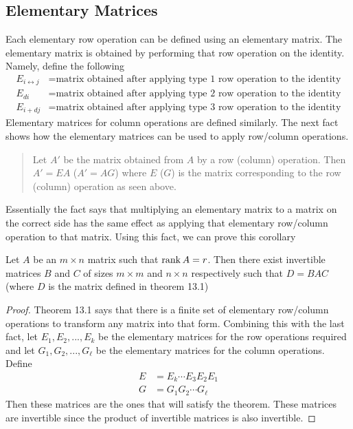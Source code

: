 \documentclass[main.tex]{subfiles}
\begin{document}
    \subsection{Elementary Matrices}
    Each elementary row operation can be defined using an elementary matrix. The elementary matrix is obtained by performing that row operation on the identity. Namely, define the following 
    \begin{align*}
        E_{i\longleftrightarrow j} &= \text{matrix obtained after applying type 1 row operation to the identity} \\ 
        E_{di} &= \text{matrix obtained after applying type 2 row operation to the identity} \\
        E_{i+dj} &= \text{matrix obtained after applying type 3 row operation to the identity}
    \end{align*}
    Elementary matrices for column operations are defined similarly. The next fact shows how the elementary matrices can be used to apply row/column operations. 

    \begin{quote}
        Let $A'$ be the matrix obtained from $A$ by a row (column) operation. Then $A' = EA$ ($A' = AG$) where $E$ ($G$) is the matrix corresponding to the row (column) operation as seen above.
    \end{quote}    
    Essentially the fact says that multiplying an elementary matrix to a matrix on the correct side has the same effect as applying that elementary row/column operation to that matrix. Using this fact, we can prove this corollary
    \begin{cor}{}{}
        Let $A$ be an $m\times n$ matrix such that $\operatorname{rank} A = r$. Then there exist invertible matrices $B$ and $C$ of sizes $m\times m$ and $n\times n$ respectively such that $D = BAC$ (where $D$ is the matrix defined in theorem 13.1)
    \end{cor}
    \begin{proof}
        Theorem 13.1 says that there is a finite set of elementary row/column operations to transform any matrix into that form. Combining this with the last fact, let $E_1, E_2, ..., E_k$ be the elementary matrices for the row operations required and let $G_1, G_2, ..., G_\ell$ be the elementary matrices for the column operations. Define 
        \begin{align*}
            E &= E_k\cdots E_3E_2E_1 \\
            G &= G_1G_2\cdots G_\ell 
        \end{align*}
        Then these matrices are the ones that will satisfy the theorem. These matrices are invertible since the product of invertible matrices is also invertible.
    \end{proof}
\end{document}
